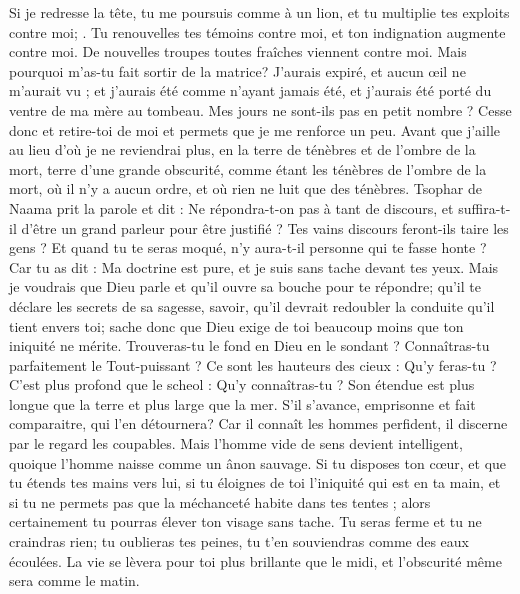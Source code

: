 \begin{multicols}{2}
Si je redresse la tête, tu me poursuis comme à un lion, et tu multiplie tes exploits contre moi; .
Tu renouvelles tes témoins contre moi, et ton indignation augmente contre moi. De nouvelles troupes toutes fraîches viennent contre moi.
Mais pourquoi m'as-tu fait sortir de la matrice? J'aurais expiré, et aucun œil ne m'aurait vu ;
et j'aurais été comme n'ayant jamais été, et j'aurais été porté du ventre de ma mère au tombeau.
Mes jours ne sont-ils pas en petit nombre ? Cesse donc et retire-toi de moi et permets que je me renforce un peu.
Avant que j'aille au lieu d'où je ne reviendrai plus, en la terre de ténèbres et de l'ombre de la mort,
terre d'une grande obscurité, comme étant les ténèbres de l'ombre de la mort, où il n'y a aucun ordre, et où rien ne luit que des ténèbres. 
\VerseOne{}Tsophar de Naama prit la parole et dit :
Ne répondra-t-on pas à tant de discours, et suffira-t-il d'être un grand parleur pour être justifié ?
Tes vains discours feront-ils taire les gens ? Et quand tu te seras moqué, n'y aura-t-il personne qui te fasse honte ?
Car tu as dit : Ma doctrine est pure, et je suis sans tache devant tes yeux. 
Mais je voudrais que Dieu parle et qu'il ouvre sa bouche pour te répondre;
qu'il te déclare les secrets de sa sagesse, savoir, qu'il devrait redoubler la conduite qu'il tient envers toi; sache donc que Dieu exige de toi beaucoup moins que ton iniquité ne mérite.
Trouveras-tu le fond en Dieu en le sondant ? Connaîtras-tu parfaitement le Tout-puissant ? 
Ce sont les hauteurs des cieux : Qu'y feras-tu ? C'est plus profond que le scheol : Qu'y connaîtras-tu ?
Son étendue est plus longue que la terre et plus large que la mer.
S'il s'avance, emprisonne et fait comparaitre, qui l'en détournera?
Car il connaît les hommes perfident, il discerne par le regard les coupables.
Mais l'homme vide de sens devient intelligent, quoique l'homme naisse comme un ânon sauvage.
Si tu disposes ton cœur, et que tu étends tes mains vers lui,
si tu éloignes de toi l'iniquité qui est en ta main, et si tu ne permets pas que la méchanceté habite dans tes tentes ; 
alors certainement tu pourras élever ton visage sans tache. Tu seras ferme et tu ne craindras rien;
tu oublieras tes peines, tu t'en souviendras comme des eaux écoulées.
La vie se lèvera pour toi plus brillante que le midi, et l'obscurité même sera comme le matin.

\end{multicols}
